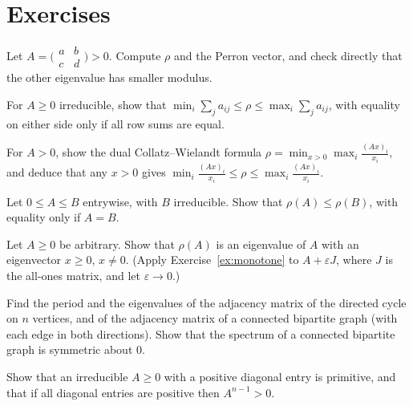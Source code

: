 \section{Exercises}

\begin{exercise}[$\star$]\label{ex:perron2}
Let $A=\bigl(\begin{smallmatrix}a&b\\c&d\end{smallmatrix}\bigr)>0$. Compute $\rho$ and the Perron vector, and check directly
that the other eigenvalue has smaller modulus.
\end{exercise}

\begin{exercise}[$\star$]\label{ex:rowsum}
For $A\ge0$ irreducible, show that $\min_i\sum_ja_{ij}\le\rho\le\max_i\sum_ja_{ij}$, with equality on either side only if all row
sums are equal.
\end{exercise}

\begin{exercise}[$\star\star$]\label{ex:minmaxcw}
For $A>0$, show the dual Collatz--Wielandt formula $\rho=\min_{x>0}\max_i\frac{(Ax)_i}{x_i}$, and deduce that any $x>0$ gives
$\min_i\frac{(Ax)_i}{x_i}\le\rho\le\max_i\frac{(Ax)_i}{x_i}$.
\end{exercise}

\begin{exercise}[$\star\star$]\label{ex:monotone}
Let $0\le A\le B$ entrywise, with $B$ irreducible. Show that $\rho(A)\le\rho(B)$, with equality only if $A=B$.
\end{exercise}

\begin{exercise}[$\star\star$]\label{ex:nonneg}
Let $A\ge0$ be arbitrary. Show that $\rho(A)$ is an eigenvalue of $A$ with an eigenvector $x\ge0$, $x\ne0$. (Apply
Exercise~\ref{ex:monotone} to $A+\varepsilon J$, where $J$ is the all-ones matrix, and let $\varepsilon\to0$.)
\end{exercise}

\begin{exercise}[$\star$]\label{ex:cycleperiod}
Find the period and the eigenvalues of the adjacency matrix of the directed cycle on $n$ vertices, and of the adjacency matrix
of a connected bipartite graph (with each edge in both directions). Show that the spectrum of a connected bipartite graph is
symmetric about $0$.
\end{exercise}

\begin{exercise}[$\star$]\label{ex:diagpos}
Show that an irreducible $A\ge0$ with a positive diagonal entry is primitive, and that if all diagonal entries are positive then
$A^{n-1}>0$.
\end{exercise}

